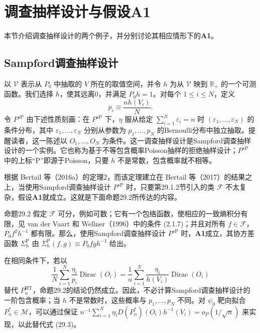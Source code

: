 \section{调查抽样设计与假设A1}

本节介绍调查抽样设计的两个例子，并分别讨论其相应情形下的\textbf{A1}。

\subsection{Sampford调查抽样设计}

以 $\mathcal V$ 表示从 $P_0$ 中抽取的 $V$ 所在的取值空间，并令 $h$ 为从 $\mathcal V$ 映到 $\mathbb R_+$ 的一个可测函数。我们选择 $h$，使其远离0，并满足 $P_0h=1$。对每个 $1\le i\le N$，定义
\[
p_i\equiv\frac{nh(V_i)}N.
\]
令 $P^{s\mathrm P}$ 由下述性质刻画：在 $P^{s\mathrm P}$ 下，$\eta$ 服从给定 $\sum_{i=1}^N\varepsilon_i=n$ 时 $(\varepsilon_1,\ldots,\varepsilon_N)$ 的条件分布，其中 $\varepsilon_1,\ldots,\varepsilon_N$ 分别从参数为 $p_1,\ldots,p_N$ 的Bernoulli分布中独立抽取。提醒读者，这一陈述以 $O_1,\ldots,O_N$ 为条件。这一调查抽样设计是Sampford调查抽样设计的一个实例。它也称为基于不等包含概率Poisson抽样的拒绝抽样设计；$P^{s\mathrm P}$ 中的上标“$\mathrm P$”即源于Poisson，只要 $h$ 不是常数，包含概率就不相等。

根据 Bertail 等（2016a）的定理2，而该定理建立在 Bertail 等（2017）的结果之上，当使用Sampford调查抽样设计 $P^{s\mathrm P}$ 时，只要第29.1.2节引入的类 $\mathcal F$ 不太复杂，假设\textbf{A1}就成立。这就是下面命题29.2所传达的内容。

\begin{bookresult}{命题}{29.2}
假定 $\mathcal F$ 可分，例如可数；它有一个包络函数，使相应的一致熵积分有限，见 van der Vaart 和 Wellner（1996）中的条件 (2.1.7)；并且对所有 $f\in\mathcal F$，$P_0f^2h^{-1}$ 都有限。那么，使用Sampford调查抽样设计 $P^{s\mathrm P}$ 时，\textbf{A1}成立，其协方差函数 $\Sigma_h^{\mathrm P}$ 由 $\Sigma_h^{\mathrm P}(f,g)\equiv P_0fgh^{-1}$ 给出。
\end{bookresult}

在相同条件下，若以
\begin{equation}
\frac1N\sum_{i=1}^N\frac{\eta_i}{p_i}\operatorname{Dirac}(O_i)
=\frac1n\sum_{i=1}^N\frac{\eta_i}{h(V_i)}\operatorname{Dirac}(O_i)
\tag{29.6}
\end{equation}
替代 $P_n^{\mathrm{HT}}$，命题29.2的结论仍然成立。因此，不必计算Sampford调查抽样设计的一阶包含概率；当 $h$ 不是常数时，这些概率与 $p_1,\ldots,p_N$ 不同。对 $\psi_0$ 靶向拟合 $P_n^*\in\mathcal M$，可以通过保证 $n^{-1}\sum_{i=1}^N\eta_iD(P_n^*)(O_i)h^{-1}(V_i)=o_P(1/\sqrt n)$ 来实现，以此替代式 (29.3)。

